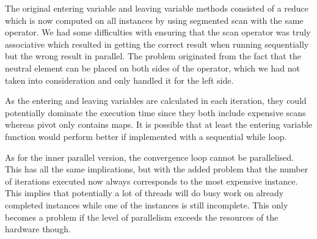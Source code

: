 \newpar
The original entering variable and leaving variable methods consisted of a reduce which is now computed on all instances by using segmented scan with the same operator. We had some difficulties with ensuring that the scan operator was truly associative which resulted in getting the correct result when running sequentially but the wrong result in parallel. The problem originated from the fact that the neutral element can be placed on both sides of the operator, which we had not taken into consideration and only handled it for the left side.

As the entering and leaving variables are calculated in each iteration, they could potentially dominate the execution time since they both include expensive scans whereas pivot only contains maps. It is possible that at least the entering variable function would perform better if implemented with a sequential while loop.

\newpar
As for the inner parallel version, the convergence loop cannot be parallelised. This has all the same implications, but with the added problem that the number of iterations executed now always corresponds to the most expensive instance. This implies that potentially a lot of threads will do busy work on already completed instances while one of the instances is still incomplete. This only becomes a problem if the level of parallelism exceeds the resources of the hardware though.
